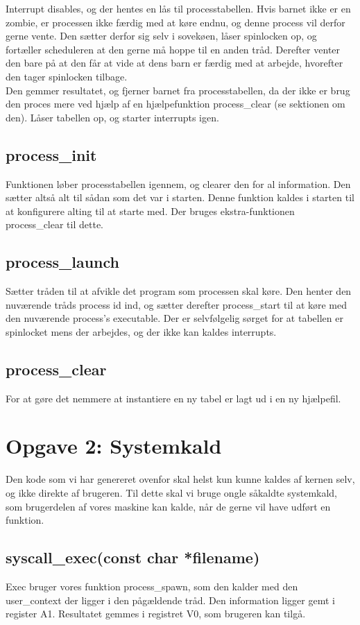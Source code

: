 \documentclass[10pt,a4paper,danish]{article}
\begin{document}
Interrupt disables, og der hentes en lås til processtabellen. Hvis barnet ikke er en zombie, er processen ikke færdig med at køre endnu, og denne process vil derfor gerne vente. Den sætter derfor sig selv i sovekøen, låser spinlocken op, og fortæller scheduleren at den gerne må hoppe til en anden tråd. Derefter venter den bare på at den får at vide at dens barn er færdig med at arbejde, hvorefter den tager spinlocken tilbage.\\

Den gemmer resultatet, og fjerner barnet fra processtabellen, da der ikke er brug den proces mere ved hjælp af en hjælpefunktion process\_clear (se sektionen om den). Låser tabellen op, og starter interrupts igen.

\subsection{process\_init}
Funktionen løber processtabellen igennem, og clearer den for al information. Den sætter altså alt til sådan som det var i starten. Denne funktion kaldes i starten til at konfigurere alting til at starte med. Der bruges ekstra-funktionen process\_clear til dette.

\subsection{process\_launch}
Sætter tråden til at afvikle det program som processen skal køre. Den henter den nuværende tråds process id ind, og sætter derefter process\_start til at køre med den nuværende process's executable. Der er selvfølgelig sørget for at tabellen er spinlocket mens der arbejdes, og der ikke kan kaldes interrupts.

\subsection{process\_clear}
For at gøre det nemmere at instantiere en ny tabel er lagt ud i en ny hjælpefil.

\section{Opgave 2: Systemkald}
Den kode som vi har genereret ovenfor skal helst kun kunne kaldes af kernen selv, og ikke direkte af brugeren. Til dette skal vi bruge ongle såkaldte systemkald, som brugerdelen af vores maskine kan kalde, når de gerne vil have udført en funktion.

\subsection{syscall\_exec(const char *filename)}
Exec bruger vores funktion process\_spawn, som den kalder med den user\_context der ligger i den pågældende tråd. Den information ligger gemt i register A1. Resultatet gemmes i registret V0, som brugeren kan tilgå.
\end{document}
